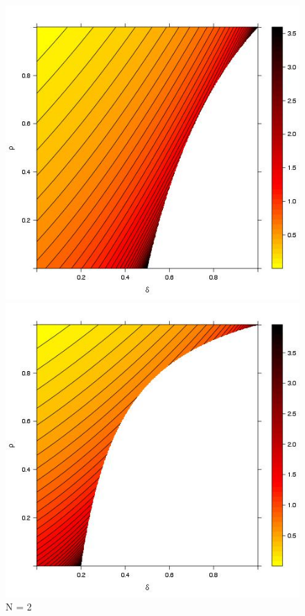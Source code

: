 \documentclass[11pt,twoside]{article}
\begin{document}
\begin{figure}[hbt!]
\begin{minipage}[t]{0.33\textwidth}
\centering
\includegraphics[width=\textwidth, height = \textwidth]{ExtremeN2.jpeg}
\caption{N = 2}
\label{ExtremeN5}
\end{minipage}
\begin{minipage}[t]{0.33\textwidth}
\centering
\includegraphics[width=\textwidth, height = \textwidth]{ExtremeN5.jpeg}

\end{minipage}
\end{figure}
\end{document}
